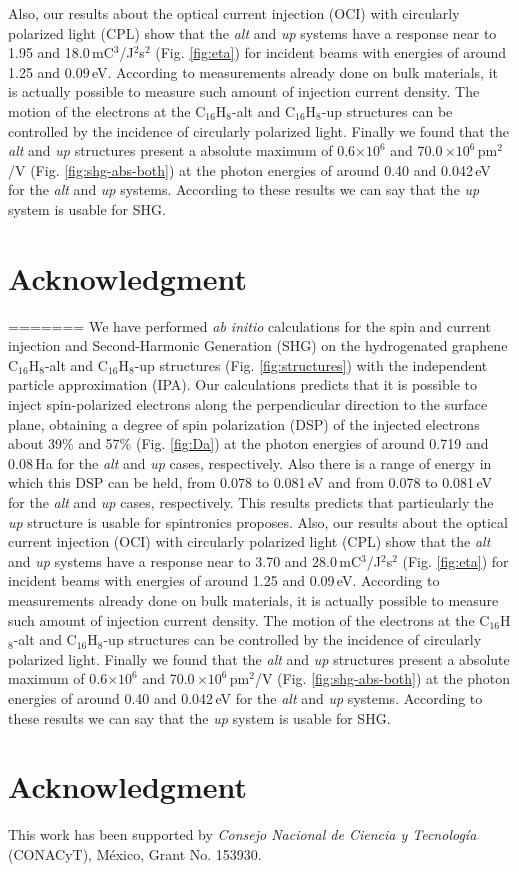 \documentclass[pss]{wiley2sp} %
\begin{document}
Also, our results about the optical current injection (OCI) with circularly polarized light (CPL)
show that the \emph{alt}  and \emph{up} systems have a response near to 1.95
and 18.0\,mC$^{3}$/J$^{2}$s$^{2}$ (Fig. \ref{fig:eta}) for incident beams with energies of around
1.25 and 0.09\,eV. According to measurements already done on bulk materials, it
is actually possible to measure such amount of injection current density. The motion of the electrons at the
C$_{16}$H$_{8}$-alt and C$_{16}$H$_{8}$-up structures can be controlled by the incidence of circularly
polarized light. Finally we found that the \emph{alt} and \emph{up} structures
present a absolute maximum of 0.6$\times 10^{6}$ and 70.0\,$\times 10^{6}
$\,pm$^{2}$/V (Fig. \ref{fig:shg-abs-both}) at the photon energies of around 0.40 and 0.042\,eV for the \emph{alt} and \emph{up} systems.
According to these results we can say that the \emph{up} system is usable for SHG.


\section{Acknowledgment} %
\label{sec:Acknouledgment}
=======
We have performed \emph{ab initio} calculations for the spin and current injection and Second-Harmonic Generation (SHG) on the hydrogenated graphene C$_{16}$H$_{8}$-alt and C$_{16}$H$_{8}$-up structures (Fig. \ref{fig:structures}) with the independent particle approximation (IPA). Our calculations predicts that it is possible to inject spin-polarized electrons along the perpendicular direction to the surface plane, obtaining a degree of spin polarization (DSP) of the injected electrons about 39\% and 57\%  (Fig. \ref{fig:Da}) at the photon energies of around 0.719 and 0.08\,Ha  for the \emph{alt} and \emph{up} cases, respectively. Also there is a range of energy in which this DSP can be held, from 0.078 to 0.081\,eV and from 0.078 to 0.081\,eV for the \emph{alt} and \emph{up} cases, respectively. This results predicts that particularly the \emph{up} structure is usable for spintronics proposes. Also, our results about the optical current injection (OCI) with circularly polarized light (CPL) show that the \emph{alt}  and \emph{up} systems have a response near to 3.70 and 28.0\,mC$^{3}$/J$^{2}$s$^{2}$ (Fig. \ref{fig:eta}) for incident beams with energies of around 1.25 and 0.09\,eV. According to measurements already done on bulk materials, it is actually possible to measure such amount of injection current density. The motion of the electrons at the C$_{16}$H$_{8}$-alt and C$_{16}$H$_{8}$-up structures can be controlled by the incidence of circularly polarized light. Finally we found that the \emph{alt} and \emph{up} structures present a absolute maximum of 0.6$\times 10^{6}$ and 70.0\,$\times 10^{6} $\,pm$^{2}$/V (Fig. \ref{fig:shg-abs-both}) at the photon energies of around 0.40 and 0.042\,eV for the \emph{alt} and \emph{up} systems. According to these results we can say that the \emph{up} system is usable for SHG.


\section{Acknowledgment}\label{sec:Acknouledgment}

This work has been supported by \emph{Consejo Nacional de Ciencia y
Tecnolog\'ia} (CONACyT), M\'exico, Grant No. 153930.




\end{document}
